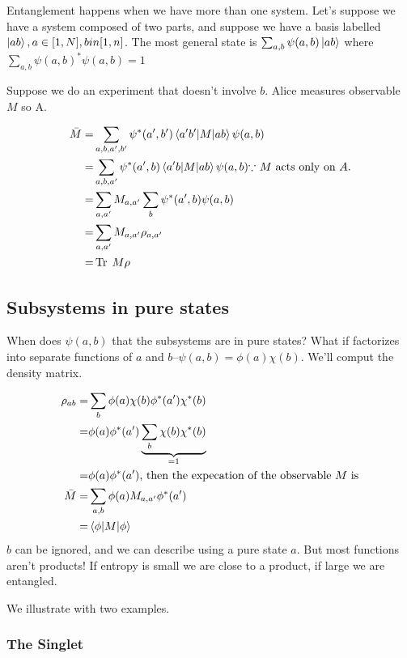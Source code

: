 \documentclass[]{article}
\DeclareMathOperator{\Tr}{Tr \;}
\begin{document}
Entanglement happens when we have more than one system. Let's suppose we have a system composed of two parts, and suppose we have a basis labelled $\ket{ab}, a \in [1,N], b in [1,n]$. The most general state is $\sum_{a,b}\psi(a,b)\ket{ab}$ where $\sum_{a,b}\psi(a,b)^*\psi(a,b)=1$

Suppose we do an experiment that doesn't involve $b$. Alice measures observable $M$ so A.

\begin{align*}
	\bar{M}=&\sum_{a,b,a^{\prime},b^{\prime}}\psi^*(a^{\prime},b^{\prime})\braket{a^{\prime}b^{\prime}\vert M \vert ab} \psi(a,b)\\
	=&\sum_{a,b,a^{\prime}}\psi^*(a^{\prime},b)\braket{a^{\prime}b\vert M \vert ab} \psi(a,b) \text{$\because$ $M$ acts only on $A$.}\\
	=& \sum_{a,a^{\prime}}  M_{a,a^\prime} \sum_b \psi^*(a^{\prime},b) \psi(a,b)\\
	=& \sum_{a,a^{\prime}}  M_{a,a^\prime} \rho_{a,a^\prime}\\
	=& \Tr M \rho
\end{align*} 



\subsection{Subsystems in pure states}
When does $\psi(a,b)$ that the subsystems are in pure states? What if factorizes into separate functions of $a$ and $b$--$\psi(a,b)=\phi(a) \chi(b)$. We'll comput the density matrix.

\begin{align*}
	\rho_{ab} =& \sum_b \phi(a) \chi(b) \phi^*(a^\prime) \chi^*(b)\\
	=& \phi(a) \phi^*(a^\prime) \underbrace{\sum_b  \chi(b)  \chi^*(b)}_\text{=1}\\
	=& \phi(a) \phi^*(a^\prime) \text{, then the expecation of the observable $M$ is}\\
	\bar{M} =& \sum_{a,b}\phi(a) M_{a,a^\prime}\phi^*(a^\prime)\\
	=& \braket{\phi\vert M\vert \phi}
\end{align*}
$b$ can be ignored, and we can describe using a pure state $a$. But most functions aren't products! If entropy is small we are close to a product, if large we are entangled.

We illustrate with two examples.

\subsubsection{The Singlet}
\end{document}
